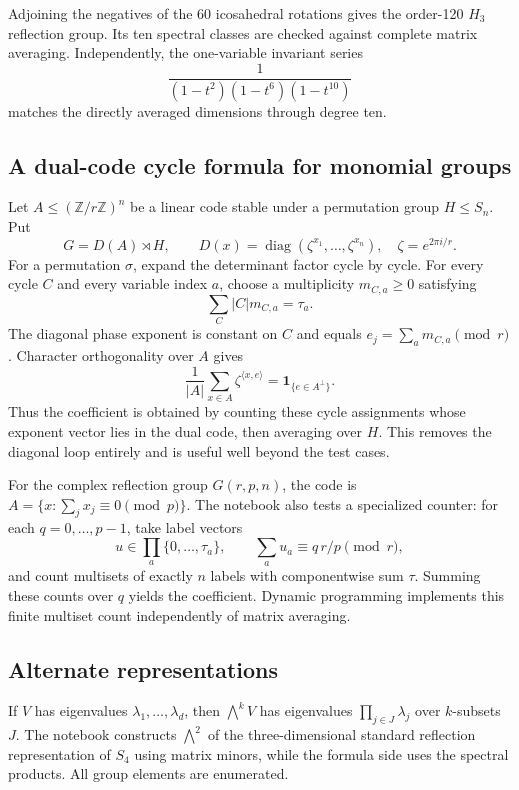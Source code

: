 \documentclass[10pt]{article}
\begin{document}
Adjoining the negatives of the 60 icosahedral rotations gives the order-120
$H_3$ reflection group.  Its ten spectral classes are checked against complete
matrix averaging.  Independently, the one-variable invariant series
\[
 \frac1{(1-t^2)(1-t^6)(1-t^{10})}
\]
matches the directly averaged dimensions through degree ten.

\subsection{A dual-code cycle formula for monomial groups}
Let $A\le(\mathbb Z/r\mathbb Z)^n$ be a linear code stable under a permutation
group $H\le S_n$.  Put
\[
 G=D(A)\rtimes H,
 \qquad D(x)=\operatorname{diag}(\zeta^{x_1},\ldots,\zeta^{x_n}),
 \quad \zeta=e^{2\pi i/r}.
\]
For a permutation $\sigma$, expand the determinant factor cycle by cycle.
For every cycle $C$ and every variable index $a$, choose a multiplicity
$m_{C,a}\ge0$ satisfying
\[
 \sum_C |C|m_{C,a}=\tau_a.
\]
The diagonal phase exponent is constant on $C$ and equals
$e_j=\sum_a m_{C,a}\pmod r$.  Character orthogonality over $A$ gives
\[
 \frac1{|A|}\sum_{x\in A}\zeta^{\langle x,e\rangle}
 =\mathbf 1_{\{e\in A^\perp\}}.
\]
Thus the coefficient is obtained by counting these cycle assignments whose
exponent vector lies in the dual code, then averaging over $H$.  This removes
the diagonal loop entirely and is useful well beyond the test cases.

For the complex reflection group $G(r,p,n)$, the code is
$A=\{x:\sum_jx_j\equiv0\pmod p\}$.  The notebook also tests a specialized
counter: for each $q=0,\ldots,p-1$, take label vectors
\[
 u\in\prod_a\{0,\ldots,\tau_a\},
 \qquad \sum_a u_a\equiv q\,r/p\pmod r,
\]
and count multisets of exactly $n$ labels with componentwise sum $\tau$.
Summing these counts over $q$ yields the coefficient.  Dynamic programming
implements this finite multiset count independently of matrix averaging.

\subsection{Alternate representations}
If $V$ has eigenvalues $\lambda_1,\ldots,\lambda_d$, then $\bigwedge^kV$ has
eigenvalues $\prod_{j\in J}\lambda_j$ over $k$-subsets $J$.  The notebook
constructs $\bigwedge^2$ of the three-dimensional standard reflection
representation of $S_4$ using matrix minors, while the formula side uses the
spectral products.  All group elements are enumerated.
\end{document}

